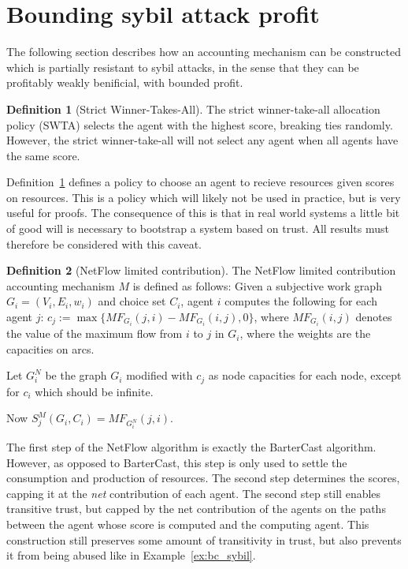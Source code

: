 \documentclass[a4paper,11pt]{book}
\theoremstyle{definition}
\newtheorem{definition}{Definition}
\begin{document}
\section{Bounding sybil attack profit}

The following section describes how an accounting mechanism can be constructed which is partially
resistant to sybil attacks, in the sense that they can be profitably weakly benificial, with bounded
profit.

\begin{definition}[Strict Winner-Takes-All]
   \label{def:SWTA}
   The strict winner-take-all allocation policy (SWTA) selects the agent with the highest score,
   breaking ties randomly. However, the strict winner-take-all will not select any agent
   when all agents have the same score.
\end{definition}

Definition~\ref{def:SWTA} defines a policy to choose an agent to recieve resources given scores
on resources. This is a policy which will likely not be used in practice, but is very useful
for proofs. The consequence of this is that in real world systems a little bit of good will
is necessary to bootstrap a system based on trust. All results must therefore be considered
with this caveat. 

\begin{definition}[NetFlow limited contribution]
    The NetFlow limited contribution accounting mechanism $M$ is defined as follows:
    Given a subjective work graph $G_i = (V_i, E_i, w_i)$ and choice set $C_i$, agent
    $i$ computes the following for each agent $j$: 
    $c_j := \max\{MF_{G_i}(j,i) - MF_{G_i}(i,j), 0\}$, where $MF_{G_i}(i,j)$ denotes
    the value of the maximum flow from $i$ to $j$ in $G_i$, where the weights are
    the capacities on arcs.

    Let $G_i^N$ be the graph $G_i$ modified with $c_j$ as node capacities for each node,
    except for $c_i$ which should be infinite.

    Now $S^M_j(G_i, C_i) = MF_{G_i^N}(j, i)$.
\end{definition}

The first step of the NetFlow algorithm is exactly the BarterCast algorithm. However,
as opposed to BarterCast, this step is only used to settle the consumption and production
of resources. The second step determines the scores, capping it at the \emph{net} contribution
of each agent. The second step still enables transitive trust, but capped by the net contribution
of the agents on the paths between the agent whose score is computed and the computing agent.
This construction still preserves some amount of transitivity in trust, but also prevents it
from being abused like in Example~\ref{ex:bc_sybil}.
\end{document}
